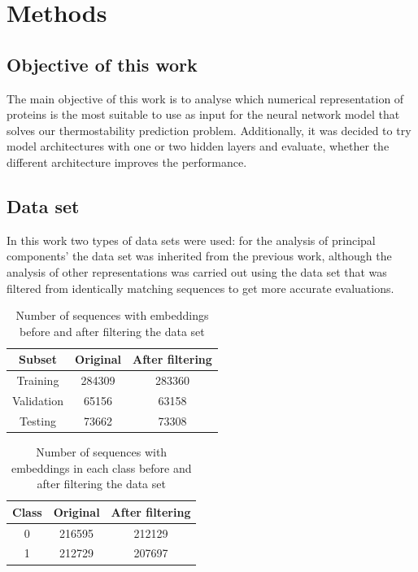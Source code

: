 \documentclass[12pt]{article}
\begin{document}
	\newpage

	\section{Methods}

	\subsection{Objective of this work}

	The main objective of this work is to analyse 
	which numerical representation of proteins is the most 
	suitable to use as input for the neural network 
	model that solves our thermostability prediction problem. 
	Additionally, it was decided to try model 
	architectures with one or two hidden layers and evaluate, 
	whether the different architecture improves the 
	performance.

	\subsection{Data set}

	In this work two types of data sets were used: for the analysis of 
	principal components' the data set was inherited from the previous 
	work, although the analysis of other representations was carried 
	out using the data set that was filtered from identically matching 
	sequences to get more accurate evaluations.

	\begin{table}[h!]
		\caption{Number of sequences with embeddings before and after 
		filtering the data set}
		\vspace{0.2cm}
		\centering
		\begin{tabular}{ | c | c c | }
			\hline 
			Subset & Original & After filtering \\
			\hline 
			Training & 284309 & 283360 \\
			Validation & 65156 & 63158 \\
			Testing & 73662 & 73308 \\
			\hline    
		\end{tabular}
		\label{table:numberEmbeddings}
	\end{table}

	\begin{table}[h!]
		\caption{Number of sequences with embeddings in each class 
		before and after filtering the data set}
		\vspace{0.2cm}
		\centering
		\begin{tabular}{ | c | c c | }
			\hline 
			Class & Original & After filtering \\
			\hline 
			0 & 216595 & 212129 \\
			1 & 212729 & 207697 \\
			\hline    
		\end{tabular}
		\label{table:numberEmbeddingsClasses}
	\end{table}
\end{document}
